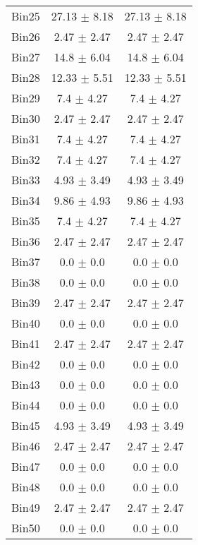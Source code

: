 \begin{tabular}{|c|c|c|}
     Bin25 & 27.13 $\pm$ 8.18 & 27.13 $\pm$ 8.18 \\ \cline{1-3} 
     Bin26 & 2.47 $\pm$ 2.47 & 2.47 $\pm$ 2.47 \\ \cline{1-3} 
     Bin27 & 14.8 $\pm$ 6.04 & 14.8 $\pm$ 6.04 \\ \cline{1-3} 
     Bin28 & 12.33 $\pm$ 5.51 & 12.33 $\pm$ 5.51 \\ \cline{1-3} 
     Bin29 & 7.4 $\pm$ 4.27 & 7.4 $\pm$ 4.27 \\ \cline{1-3} 
     Bin30 & 2.47 $\pm$ 2.47 & 2.47 $\pm$ 2.47 \\ \cline{1-3} 
     Bin31 & 7.4 $\pm$ 4.27 & 7.4 $\pm$ 4.27 \\ \cline{1-3} 
     Bin32 & 7.4 $\pm$ 4.27 & 7.4 $\pm$ 4.27 \\ \cline{1-3} 
     Bin33 & 4.93 $\pm$ 3.49 & 4.93 $\pm$ 3.49 \\ \cline{1-3} 
     Bin34 & 9.86 $\pm$ 4.93 & 9.86 $\pm$ 4.93 \\ \cline{1-3} 
     Bin35 & 7.4 $\pm$ 4.27 & 7.4 $\pm$ 4.27 \\ \cline{1-3} 
     Bin36 & 2.47 $\pm$ 2.47 & 2.47 $\pm$ 2.47 \\ \cline{1-3} 
     Bin37 & 0.0 $\pm$ 0.0 & 0.0 $\pm$ 0.0 \\ \cline{1-3} 
     Bin38 & 0.0 $\pm$ 0.0 & 0.0 $\pm$ 0.0 \\ \cline{1-3} 
     Bin39 & 2.47 $\pm$ 2.47 & 2.47 $\pm$ 2.47 \\ \cline{1-3} 
     Bin40 & 0.0 $\pm$ 0.0 & 0.0 $\pm$ 0.0 \\ \cline{1-3} 
     Bin41 & 2.47 $\pm$ 2.47 & 2.47 $\pm$ 2.47 \\ \cline{1-3} 
     Bin42 & 0.0 $\pm$ 0.0 & 0.0 $\pm$ 0.0 \\ \cline{1-3} 
     Bin43 & 0.0 $\pm$ 0.0 & 0.0 $\pm$ 0.0 \\ \cline{1-3} 
     Bin44 & 0.0 $\pm$ 0.0 & 0.0 $\pm$ 0.0 \\ \cline{1-3} 
     Bin45 & 4.93 $\pm$ 3.49 & 4.93 $\pm$ 3.49 \\ \cline{1-3} 
     Bin46 & 2.47 $\pm$ 2.47 & 2.47 $\pm$ 2.47 \\ \cline{1-3} 
     Bin47 & 0.0 $\pm$ 0.0 & 0.0 $\pm$ 0.0 \\ \cline{1-3} 
     Bin48 & 0.0 $\pm$ 0.0 & 0.0 $\pm$ 0.0 \\ \cline{1-3} 
     Bin49 & 2.47 $\pm$ 2.47 & 2.47 $\pm$ 2.47 \\ \cline{1-3} 
     Bin50 & 0.0 $\pm$ 0.0 & 0.0 $\pm$ 0.0 \\ \cline{1-3} 

\end{tabular}
